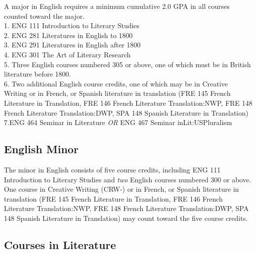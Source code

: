 \documentclass[
  letterpaper,
]{scrbook}
\begin{document}
A major in English requires a minimum cumulative 2.0 GPA in all courses
counted toward the major.\\
1. ENG 111 Introduction to Literary Studies\\
2. ENG 281 Literatures in English to 1800\\
3. ENG 291 Literatures in English after 1800\\
4. ENG 301 The Art of Literary Research\\
5. Three English courses numbered 305 or above, one of which must be in
British literature before 1800.\\
6. Two additional English course credits, one of which may be in
Creative Writing or in French, or Spanish literature in translation (FRE
145 French Literature in Translation, FRE 146 French Literature
Translation:NWP, FRE 148 French Literature Translation:DWP, SPA 148
Spanish Literature in Translation)\\
7.ENG 464 Seminar in Literature \emph{OR} ENG 467 Seminar
inLit:USPluralism

\subsection{English Minor}\label{english-minor}

The minor in English consists of five course credits, including ENG 111
Introduction to Literary Studies and \emph{two} English courses numbered
300 or above. One course in Creative Writing (CRW-) or in French, or
Spanish literature in translation (FRE 145 French Literature in
Translation, FRE 146 French Literature Translation:NWP, FRE 148 French
Literature Translation:DWP, SPA 148 Spanish Literature in Translation)
may count toward the five course credits.

\subsection{Courses in Literature}\label{courses-in-literature}
\end{document}
